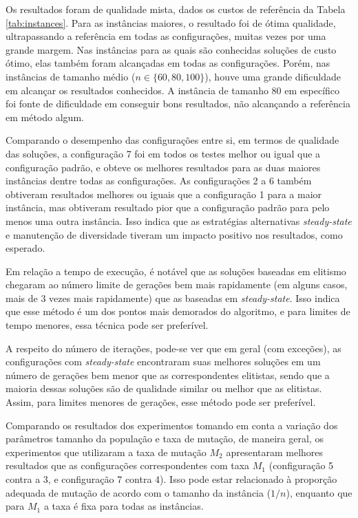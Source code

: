 \documentclass{MO824}
\begin{document}
Os resultados foram de qualidade mista, dados os custos de referência da Tabela \ref{tab:instances}. Para as instâncias maiores, o resultado foi de ótima qualidade, ultrapassando a referência em todas as configurações, muitas vezes por uma grande margem. Nas instâncias para as quais são conhecidas soluções de custo ótimo, elas também foram alcançadas em todas as configurações. Porém, nas instâncias de tamanho médio ($n \in \{60, 80, 100\}$), houve uma grande dificuldade em alcançar os resultados conhecidos. A instância de tamanho 80 em específico foi fonte de dificuldade em conseguir bons resultados, não alcançando a referência em método algum.

Comparando o desempenho das configurações entre si, em termos de qualidade das soluções, a configuração 7 foi em todos os testes melhor ou igual que a configuração padrão, e obteve os melhores resultados para as duas maiores instâncias dentre todas as configurações. As configurações 2 a 6 também obtiveram resultados melhores ou iguais que a configuração 1 para a maior instância, mas obtiveram resultado pior que a configuração padrão para pelo menos uma outra instância. Isso indica que as estratégias alternativas \textit{steady-state} e manutenção de diversidade tiveram um impacto positivo nos resultados, como esperado.

Em relação a tempo de execução, é notável que as soluções baseadas em elitismo chegaram ao número limite de gerações bem mais rapidamente (em alguns casos, mais de 3 vezes mais rapidamente) que as baseadas em \textit{steady-state}. Isso indica que esse método é um dos pontos mais demorados do algoritmo, e para limites de tempo menores, essa técnica pode ser preferível.

A respeito do número de iterações, pode-se ver que em geral (com exceções), as configurações com \textit{steady-state} encontraram suas melhores soluções em um número de gerações bem menor que as correspondentes elitistas, sendo que a maioria dessas soluções são de qualidade similar ou melhor que as elitistas. Assim, para limites menores de gerações, esse método pode ser preferível.

Comparando os resultados dos experimentos tomando em conta a variação dos parâmetros tamanho da população e taxa de mutação, de maneira geral, os experimentos que utilizaram a taxa de mutação $M_2$ apresentaram melhores resultados que as configurações correspondentes com taxa $M_1$ (configuração 5 contra a 3, e configuração 7 contra 4). Isso pode estar relacionado à proporção adequada de mutação de acordo com o tamanho da instância ($1/n$), enquanto que para $M_1$ a taxa é fixa para todas as instâncias. 
\end{document}
